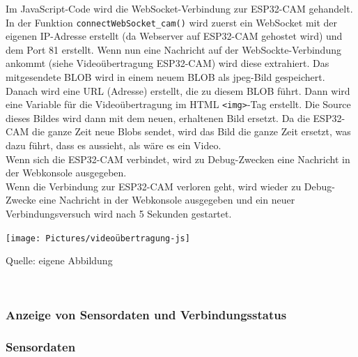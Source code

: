 \documentclass[ngerman,12pt,a4paper]{article}
\begin{document}
	Im JavaScript-Code wird die WebSocket-Verbindung zur ESP32-CAM gehandelt. In der Funktion \texttt{connectWebSocket\_cam()} wird zuerst ein WebSocket mit der eigenen IP-Adresse erstellt (da Webserver auf ESP32-CAM gehostet wird) und dem Port 81 erstellt. Wenn nun eine Nachricht auf der WebSockte-Verbindung ankommt (siehe Videoübertragung ESP32-CAM) wird diese extrahiert. Das mitgesendete BLOB wird in einem neuem BLOB als jpeg-Bild gespeichert. Danach wird eine URL (Adresse) erstellt, die zu diesem BLOB führt. Dann wird eine Variable für die Videoübertragung im HTML \texttt{<img>}-Tag erstellt. Die Source dieses Bildes wird dann mit dem neuen, erhaltenen Bild ersetzt. Da die ESP32-CAM die ganze Zeit neue Blobs sendet, wird das Bild die ganze Zeit ersetzt, was dazu führt, dass es aussieht, als wäre es ein Video. \\[0.5cm]
	Wenn sich die ESP32-CAM verbindet, wird zu Debug-Zwecken eine Nachricht in der Webkonsole ausgegeben. \\[0.5cm]
	Wenn die Verbindung zur ESP32-CAM verloren geht, wird wieder zu Debug-Zwecke eine Nachricht in der Webkonsole ausgegeben und ein neuer Verbindungsversuch wird nach 5 Sekunden gestartet. \\[0.5cm]
	\begin{center}
		\begin{minipage}[t]{\textwidth}
			\texttt{[image: Pictures/videoübertragung-js]}
			\label{fig:videoübertragung-js}
			\vspace{-10pt}
			\begin{center}
				\par\small Quelle: eigene Abbildung 
			\end{center}
		\end{minipage} \\[0.75cm]
	\end{center}
	
	
			
			\subsubsection{Anzeige von Sensordaten und Verbindungsstatus}
			
				\subsubsection*{Sensordaten}	
			
\end{document}
